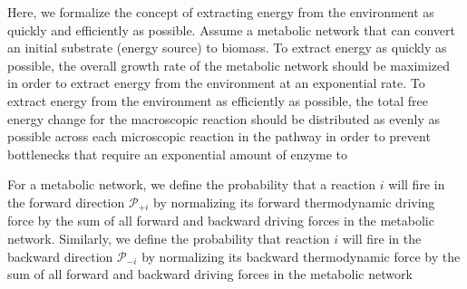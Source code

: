 Here, we formalize the concept of extracting energy from the environment as quickly and efficiently as possible. Assume a metabolic network that can convert an initial substrate (energy source) to biomass. To extract energy as quickly as possible, the overall growth rate of the metabolic network should be maximized in order to extract energy from the environment at an exponential rate.   To extract energy from the environment as efficiently as possible, the total free energy change for the macroscopic reaction should be distributed as evenly as possible across each microscopic reaction in the pathway in order to prevent bottlenecks that require an exponential amount of enzyme to 


For a metabolic network, we define the probability that a reaction $i$ will fire in the forward  direction ${\mathcal P_{+i}}$ by normalizing its forward thermodynamic driving force by the sum of all forward and backward driving forces in the metabolic network. Similarly, we define the probability that reaction $i$ will fire in the backward direction $\mathcal P_{-i}$ by normalizing its backward thermodynamic force by  the sum of all forward and backward driving forces in the metabolic network